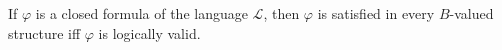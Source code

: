 If $\varphi$ is a closed formula of the language $\mathcal{L}$, then $\varphi$ is satisfied in every $B$-valued structure iff $\varphi$ is logically valid.
